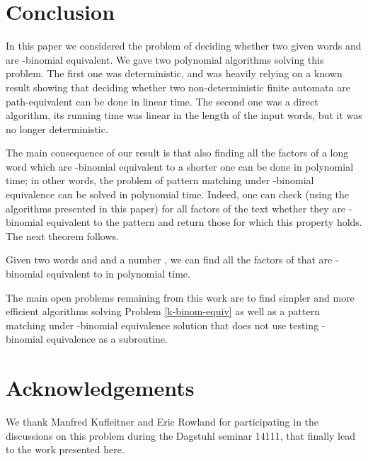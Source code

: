 \documentclass[runningheads]{llncs}
\begin{document}
\section{Conclusion}
In this paper we considered the problem of deciding whether two given words  and  are -binomial equivalent. We gave two polynomial algorithms solving this problem. The first one was deterministic, and was heavily relying on a known result showing that deciding whether two non-deterministic finite automata are path-equivalent can be done in linear time. The second one was a direct algorithm, its running time was linear in the length of the input words, but it was no longer deterministic. 

The main consequence of our result is that also finding all the factors of a long word which are -binomial equivalent to a shorter one can be done in polynomial time; in other words, the problem of pattern matching under -binomial equivalence can be solved in polynomial time. Indeed, one can check (using the algorithms presented in this paper) for all factors of the text whether they are -binomial equivalent to the pattern and return those for which this property holds. The next theorem follows.
\begin{theorem}
Given two words  and  and a number , we can find all the factors of  that are -binomial equivalent to  in polynomial time.
\end{theorem}

The main open problems remaining from this work are to find simpler and more efficient algorithms solving Problem \ref{k-binom-equiv} as well as a pattern matching under -binomial equivalence solution that does not use testing -binomial equivalence as a subroutine. 


\section*{Acknowledgements}
We thank Manfred Kufleitner and Eric Rowland for participating in the discussions on this problem during the Dagstuhl seminar 14111, that finally lead to the work presented here.



\end{document}
